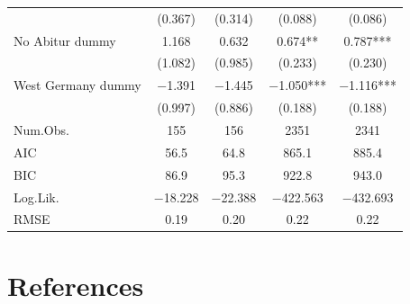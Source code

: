 \documentclass[
]{article}
\begin{document}
\begin{table}[!h]
\begin{tabular}[t]{lcccc}
 & (\num{0.367}) & (\num{0.314}) & (\num{0.088}) & (\num{0.086})\\
No Abitur dummy & \num{1.168} & \num{0.632} & \num{0.674}** & \num{0.787}***\\
 & (\num{1.082}) & (\num{0.985}) & (\num{0.233}) & (\num{0.230})\\
West Germany dummy & \num{-1.391} & \num{-1.445} & \num{-1.050}*** & \num{-1.116}***\\
 & (\num{0.997}) & (\num{0.886}) & (\num{0.188}) & (\num{0.188})\\
\midrule
Num.Obs. & \num{155} & \num{156} & \num{2351} & \num{2341}\\
AIC & \num{56.5} & \num{64.8} & \num{865.1} & \num{885.4}\\
BIC & \num{86.9} & \num{95.3} & \num{922.8} & \num{943.0}\\
Log.Lik. & \num{-18.228} & \num{-22.388} & \num{-422.563} & \num{-432.693}\\
RMSE & \num{0.19} & \num{0.20} & \num{0.22} & \num{0.22}\\
\bottomrule
\end{tabular}
\end{table}

\hypertarget{references}{%
\section*{References}\label{references}}
\end{document}
